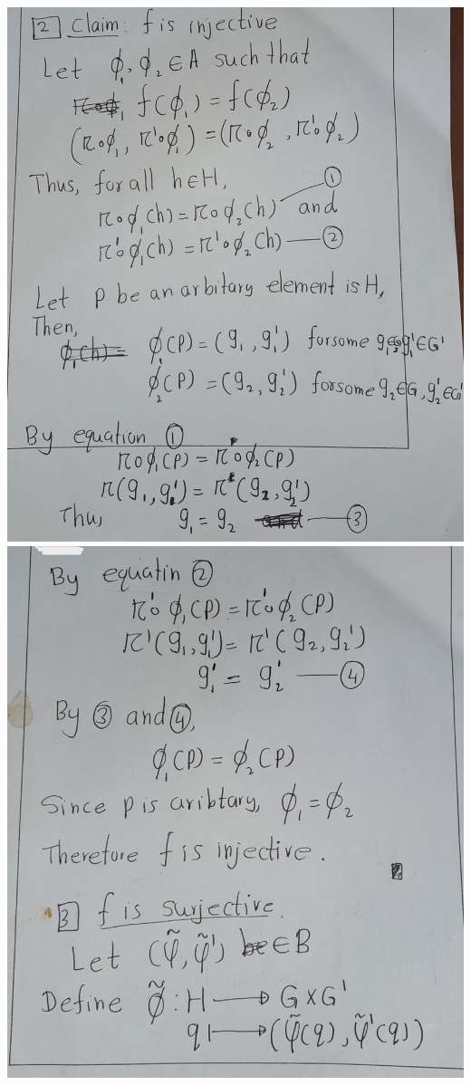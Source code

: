 \documentclass[
]{book}
\begin{document}
\includegraphics{figures/ch_2/fig13.jpg}
\includegraphics{figures/ch_2/fig14.jpg}
\end{document}
